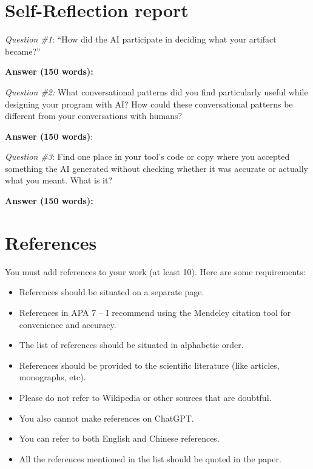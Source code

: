 \documentclass[12pt,a4paper]{article}
\begin{document}
\section{Self-Reflection report }

\textit{Question \#1}:\textbf{ }“How did the AI participate in deciding what your artifact became?” 

\vspace{0.3cm}
\noindent \textbf{Answer (150 words):}

\vspace{0.3cm}
\noindent \textit{Question \#2:} What conversational patterns did you find particularly useful while designing your program with AI? How could these conversational patterns be different from your conversations with humans? 

\vspace{0.3cm}
\noindent \textbf{Answer (150 words)}:

\vspace{0.3cm}
\noindent \textit{Question \#3}: Find one place in your tool's code or copy where you accepted something the AI generated without checking whether it was accurate or actually what you meant. What is it? 

\vspace{0.3cm}
\noindent \textbf{Answer (150 words):}


\newpage
\section*{References}
You must add references to your work (at least 10). Here are some requirements:
\begin{itemize}[itemsep=0pt, parsep=0pt]
    \item References should be situated on a separate page.
    \item References in APA 7 – I recommend using the Mendeley citation tool for convenience and accuracy.
    \item The list of references should be situated in alphabetic order.
    \item References should be provided to the scientific literature (like articles, monographs, etc).
    \item Please do not refer to Wikipedia or other sources that are doubtful.
    \item You also cannot make references on ChatGPT.
    \item You can refer to both English and Chinese references.
    \item All the references mentioned in the list should be quoted in the paper.
\end{itemize}
\end{document}
